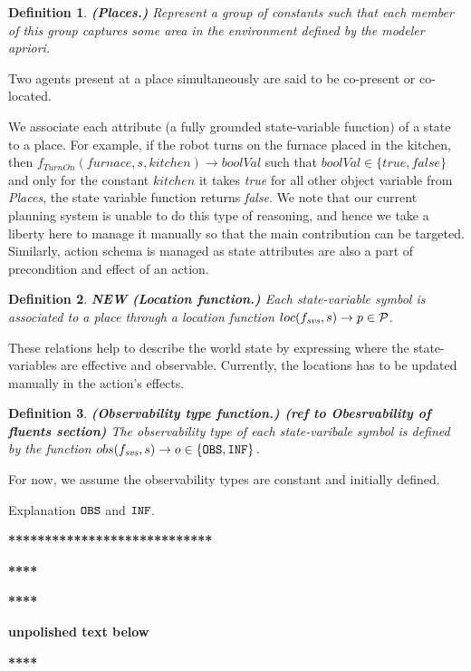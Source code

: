 \documentclass[letterpaper]{article} %
\newtheorem{definition}{Definition}
\begin{document}
\begin{definition}
\textbf{(Places.)} Represent a group of constants such that each member of this group captures some area in the environment defined by the modeler apriori.  
\end{definition}
Two agents present at a place simultaneously are said to be co-present or co-located.

We associate each attribute (a fully grounded state-variable function) of a state to a place. For example, if the robot turns on the furnace placed in the kitchen, then $f_{\textit{TurnOn}}(\textit{furnace}, s, kitchen) \rightarrow \textit{boolVal}$ such that $\textit{boolVal} \in \{\textit{true},\textit{false}\}$ and only for the constant $kitchen$ it takes \textit{true} for all other object variable from \textit{Places}, the state variable function returns \textit{false}. We note that our current planning system is unable to do this type of reasoning, and hence we take a liberty here to manage it manually so that the main contribution can be targeted. 
Similarly, action schema is managed as state attributes are also a part of precondition and effect of an action. 

\begin{definition}
\textbf{NEW (Location function.)}
Each \textit{state-variable symbol} is associated to a place through a location function $loc(f_{\textit{svs}}, s) \rightarrow p \in \mathcal{P}$.
\end{definition}
These relations help to describe the world state by expressing where the state-variables are effective and observable. Currently, the locations has to be updated manually in the action's effects.

\begin{definition}
\textbf{(Observability type function.) (ref to Obesrvability of fluents section)}
The observability type of each \textit{state-varibale symbol} is defined by the function $obs(f_{\textit{svs}}, s) \rightarrow o \in\{\texttt{OBS}, \texttt{INF}\}$.
\end{definition}
For now, we assume the observability types are constant and initially defined.

Explanation $\texttt{OBS}$ and $\texttt{INF}$.


\textbf{****************************}

\textbf{**** }

\textbf{**** }

\textbf{unpolished text below}

\textbf{**** }
\end{document}
